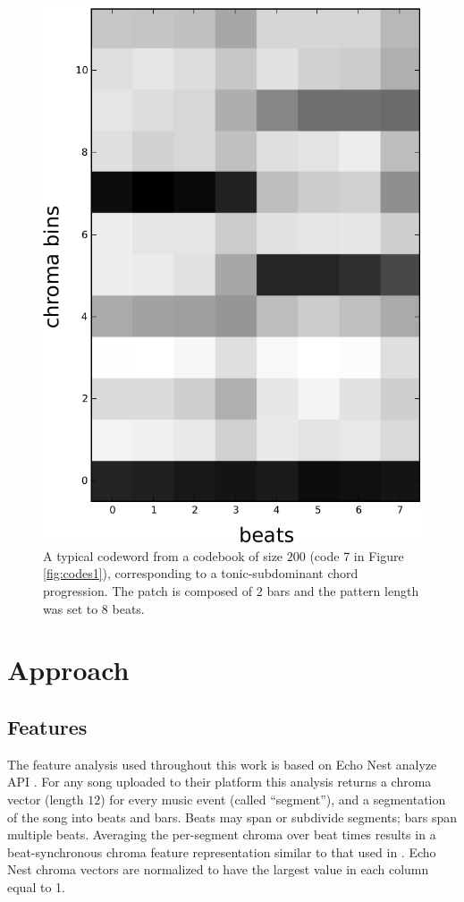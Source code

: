 \documentclass{article}
\begin{document}
\begin{figure}[t]
\begin{center}
\includegraphics[width=.4\columnwidth]{code_axis}
\end{center}
\caption{\small{A typical codeword from a codebook of size $200$ (code
    7 in Figure \ref{fig:codes1}), corresponding to a
    tonic-subdominant chord progression.  The patch is composed of $2$
    bars and the pattern length was set to $8$ beats.  }}
\label{fig:code}
\end{figure}


\section{Approach}\label{sec:approach}

\subsection{Features}
The feature analysis used throughout this work is based on Echo Nest
analyze API \cite{EchoNest}.  
%
For any song uploaded to their platform this analysis returns a chroma
vector (length $12$) for every music event (called ``segment''), and a
segmentation of the song into beats and bars. Beats may span or 
subdivide segments; bars span multiple beats.
%
Averaging the per-segment chroma over beat times results in a
beat-synchronous chroma feature representation similar to that used in
\cite{Ellis2007a}.  Echo Nest chroma vectors are normalized to have the 
largest value in each column equal to 1.

\end{document}
